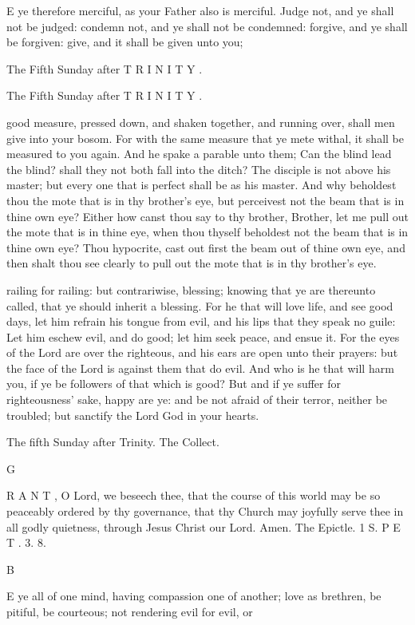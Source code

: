 E ye therefore merciful, as your Father also is merciful. Judge not, and ye shall not be judged: condemn not, and ye shall not be condemned: forgive, and ye shall be forgiven: give, and it shall be given unto you;

The Fifth Sunday after T R I N I T Y .

The Fifth Sunday after T R I N I T Y .

good measure, pressed down, and shaken together, and running over, shall men give into your bosom. For with the same measure that ye mete withal, it shall be measured to you again. And he spake a parable unto them; Can the blind lead the blind? shall they not both fall into the ditch? The disciple is not above his master; but every one that is perfect shall be as his master. And why beholdest thou the mote that is in thy brother’s eye, but perceivest not the beam that is in thine own eye? Either how canst thou say to thy brother, Brother, let me pull out the mote that is in thine eye, when thou thyself beholdest not the beam that is in thine own eye? Thou hypocrite, cast out first the beam out of thine own eye, and then shalt thou see clearly to pull out the mote that is in thy brother’s eye.

railing for railing: but contrariwise, blessing; knowing that ye are thereunto called, that ye should inherit a blessing. For he that will love life, and see good days, let him refrain his tongue from evil, and his lips that they speak no guile: Let him eschew evil, and do good; let him seek peace, and ensue it. For the eyes of the Lord are over the righteous, and his ears are open unto their prayers: but the face of the Lord is against them that do evil. And who is he that will harm you, if ye be followers of that which is good? But and if ye suffer for righteousness’ sake, happy are ye: and be not afraid of their terror, neither be troubled; but sanctify the Lord God in your hearts.

The fifth Sunday after Trinity. The Collect.

G

R A N T , O Lord, we beseech thee, that the course of this world may be so peaceably ordered by thy governance, that thy Church may joyfully serve thee in all godly quietness, through Jesus Christ our Lord. Amen. The Epictle. 1 S. P E T . 3. 8.

B

E ye all of one mind, having compassion one of another; love as brethren, be pitiful, be courteous; not rendering evil for evil, or

